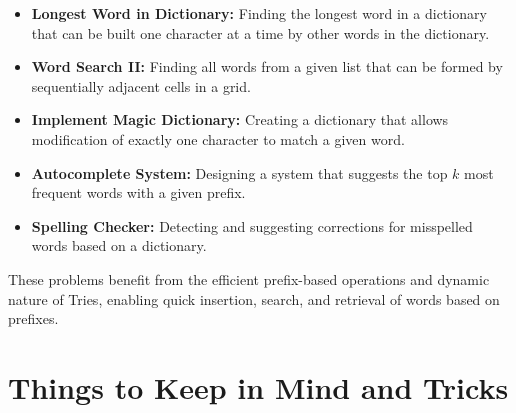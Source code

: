 \begin{itemize}
    \item \textbf{Longest Word in Dictionary:} Finding the longest word in a dictionary that can be built one character at a time by other words in the dictionary.
    
    \item \textbf{Word Search II:} Finding all words from a given list that can be formed by sequentially adjacent cells in a grid.
    
    \item \textbf{Implement Magic Dictionary:} Creating a dictionary that allows modification of exactly one character to match a given word.
    
    \item \textbf{Autocomplete System:} Designing a system that suggests the top \(k\) most frequent words with a given prefix.
    
    \item \textbf{Spelling Checker:} Detecting and suggesting corrections for misspelled words based on a dictionary.
\end{itemize}

These problems benefit from the efficient prefix-based operations and dynamic nature of Tries, enabling quick insertion, search, and retrieval of words based on prefixes.

\section*{Things to Keep in Mind and Tricks}

